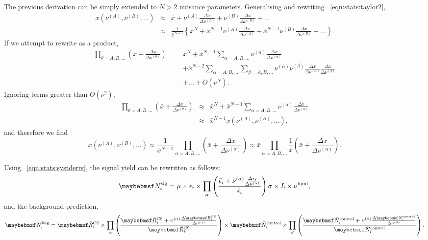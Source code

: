 The previous derivation can be simply extended to $N > 2$ nuisance
parameters. Generalising and rewriting \eqn~\ref{eqn:stats:taylor2},
\begin{eqnarray*}
x(\nu^{(A)}, \nu^{(B)}, \ldots) &\approx& \bar{x} +
\nu^{(A)}\frac{\Delta x}{\Delta\nu^{(A)}} +
\nu^{(B)}\frac{\Delta x}{\Delta\nu^{(B)}} + \ldots \\
&\approx& \frac{1}{\bar{x}^{N-1}} \left\{ \bar{x}^N +
\bar{x}^{N-1} \nu^{(A)}\frac{\Delta x}{\Delta\nu^{(A)}} +
\bar{x}^{N-1} \nu^{(B)}\frac{\Delta x}{\Delta\nu^{(B)}} + \ldots \right\}.
\end{eqnarray*}
If we attempt to rewrite as a product,
\begin{eqnarray*}
\prod_{\theta=A, B, \ldots} \left(\bar{x} + \frac{\Delta x}{\Delta\nu^{(\theta)}}\right) &=&
\bar{x}^N + \bar{x}^{N-1} \sum_{\alpha=A, B, \ldots} \nu^{(\alpha)}\frac{\Delta x}{\Delta \nu^{(\alpha)}} \\
&&+ \bar{x}^{N-2}\sum_{\alpha=A, B, \ldots} \sum_{\beta=A, B, \ldots} \nu^{(\alpha)}\nu^{(\beta)}\frac{\Delta x}{\Delta
  \nu^{(\alpha)}}\frac{\Delta x}{\Delta \nu^{(\beta)}} \\
&&+ \ldots + O(\nu^N).
\end{eqnarray*}
Ignoring terms greater than $O(\nu^2)$,
\begin{eqnarray*}
\prod_{\theta=A, B, \ldots} \left(\bar{x} + \frac{\Delta x}{\Delta\nu^{(\theta)}}\right) &\approx&
\bar{x}^N + \bar{x}^{N-1} \sum_{\alpha=A, B, \ldots} \nu^{(\alpha)}\frac{\Delta x}{\Delta
  \nu^{(\alpha)}} \\
&\approx& \bar{x}^{N-1} x(\nu^{(A)}, \nu^{(B)}, \ldots),
\end{eqnarray*}
and therefore we find
\begin{equation}
\label{eqn:stats:systderiv}
x(\nu^{(A)}, \nu^{(B)}, \ldots) \approx \frac{1}{\bar{x}^{N-1}} \prod_{\alpha = A, B,
  \ldots} \left(\bar{x} + \frac{\Delta x}{\Delta\nu^{(\alpha)}}\right) \approx
\bar{x} \prod_{\alpha = A, B,
  \ldots} \frac{1}{\bar{x}}\left(\bar{x} + \frac{\Delta x}{\Delta\nu^{(\alpha)}}\right).
\end{equation}

Using \eqn~\ref{eqn:stats:systderiv}, the signal yield can be rewritten as follows:
\begin{equation*}
\NSigi = \mu \times \bar{\epsilon}_i \times \prod_{\alpha}\left(\frac{\bar{\epsilon}_i
    + \nu^{(\alpha)}\frac{\Delta\epsilon_i}{\Delta\nu^{(\alpha)}}}{\bar{\epsilon}_i}\right) \sigma \times L \times \nu^{\textrm{lumi}},
\end{equation*}
and the background prediction,
\begin{equation*}
\NBkgi = \RbarCS_i \times \prod_{\alpha}\left( \frac{\RbarCS_i
    + \nu^{(\alpha)}\frac{\Delta\RCSi}{\Delta\nu^{(\alpha)}}}{\RbarCS_i}\right)
\times \NbarControl_i \times \prod_{\beta}\left( \frac{\NbarControl_i
    + \nu^{(\beta)}\frac{\Delta\NControli}{\Delta\nu^{(\beta)}}}{\NbarControl_i}\right).
\end{equation*}

